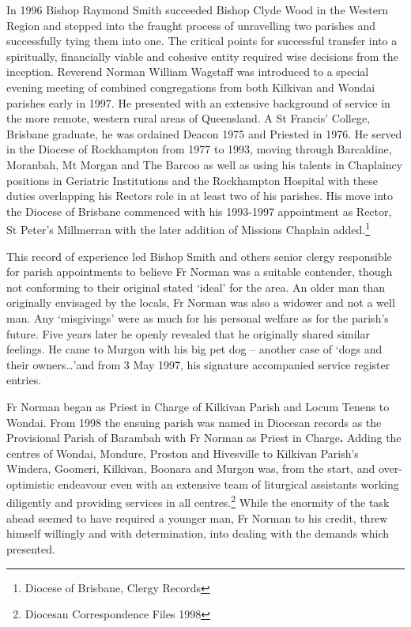 In 1996 Bishop Raymond Smith succeeded Bishop Clyde Wood in the Western Region and stepped into the fraught process of unravelling two parishes and successfully tying them into one. The critical points for successful transfer into a spiritually, financially viable and cohesive entity required wise decisions from the inception. Reverend Norman William Wagstaff was introduced to a special evening meeting of combined congregations from both Kilkivan and Wondai parishes early in 1997. He presented with an extensive background of service in the more remote, western rural areas of Queensland. A St Francis' College, Brisbane graduate, he was ordained Deacon 1975 and Priested in 1976. He served in the Diocese of Rockhampton from 1977 to 1993, moving through Barcaldine, Moranbah, Mt Morgan and The Barcoo as well as using his talents in Chaplaincy positions in Geriatric Institutions and the Rockhampton Hospital with these duties overlapping his Rectors role in at least two of his parishes. His move into the Diocese of Brisbane commenced with his 1993-1997 appointment as Rector, St Peter's Millmerran with the later addition of Missions Chaplain added.\footnote{Diocese of Brisbane, Clergy Records}

This record of experience led Bishop Smith and others senior clergy responsible for parish appointments to believe Fr Norman was a suitable contender, though not conforming to their original stated `ideal' for the area. An older man than originally envisaged by the locals, Fr Norman was also a widower and not a well man. Any `misgivings' were as much for his personal welfare as for the parish's future. Five years later he openly revealed that he originally shared similar feelings. He came to Murgon with his big pet dog -- another case of `dogs and their owners\ldots'and from 3 May 1997, his signature accompanied service register entries.

Fr Norman began as Priest in Charge of Kilkivan Parish and Locum Tenens to Wondai. From 1998 the ensuing parish was named in Diocesan records as the Provisional Parish of Barambah with Fr Norman as Priest in Charge\textbf{.} Adding the centres of Wondai, Mondure, Proston and Hivesville to Kilkivan Parish's Windera, Goomeri, Kilkivan, Boonara and Murgon was, from the start, and over-optimistic endeavour even with an extensive team of liturgical assistants working diligently and providing services in all centres.\footnote{Diocesan Correspondence Files 1998} While the enormity of the task ahead seemed to have required a younger man, Fr Norman to his credit, threw himself willingly and with determination, into dealing with the demands which presented.

